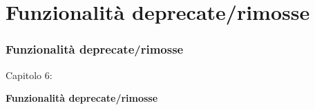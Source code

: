 %

\section{Funzionalità deprecate/rimosse}
\begin{frame}[fragile]
	\frametitle{Funzionalità deprecate/rimosse}

	\begin{center}\huge{Capitolo 6:}\end{center}
	\begin{center}\huge{\color{typo3darkgrey}\textbf{Funzionalità deprecate/rimosse}}\end{center}

\end{frame}



